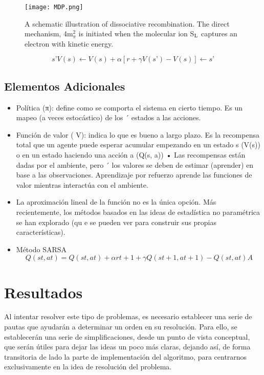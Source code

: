 \documentclass[letterpaper, 10 pt, conference]{ieeeconf}  %
\begin{document}
\begin{figure}[bh] 
\centerline{\texttt{[image: MDP.png]}} %
\vspace*{8pt}
\caption{A schematic illustration of dissociative recombination. The
direct mechanism, 4m$^2_\pi$ is initiated when the
molecular ion S$_{\rm L}$ captures an electron with kinetic energy.}
\end{figure}

$$
s’ V(s) ← V(s) + α[r + γV(s’)-V(s)]  ← s’
$$

\subsection{Elementos Adicionales }

\begin{itemize}

\item Política (π): define como se comporta el sistema en cierto tiempo. Es un mapeo (a veces estocástico) de los ´ estados a las acciones. 

\item Función de valor ( V): indica lo que es bueno a largo plazo. Es la recompensa total que un agente puede esperar acumular empezando en un estado s (V(s)) o en un estado haciendo una acción a (Q(s, a)) • Las recompensas están dadas por el ambiente, pero ´ los valores se deben de estimar (aprender) en base a las observaciones. Aprendizaje por refuerzo aprende las funciones de valor mientras interactúa con el ambiente.
\item La aproximación lineal de la función no es la única opción. Más recientemente, los métodos basados en las ideas de estadística no paramétrica se han explorado (qu e se pueden ver para construir sus propias características). 
\item Método SARSA $$  Q(st, at) = Q(st, at) + α rt+1 + γQ(st+1, at+1) − Q(st, at) A $$

\end{itemize}


\section{Resultados}
Al intentar resolver este tipo de problemas, es necesario establecer una serie de pautas que ayudarán a determinar un orden en su resolución. Para ello, se establecerán una serie de simplificaciones, desde un punto de vista conceptual, que serán útiles para dejar las ideas un poco más claras, dejando así, de forma transitoria de lado la parte de implementación del algoritmo, para centrarnos exclusivamente en la idea de resolución del problema.
\end{document}
